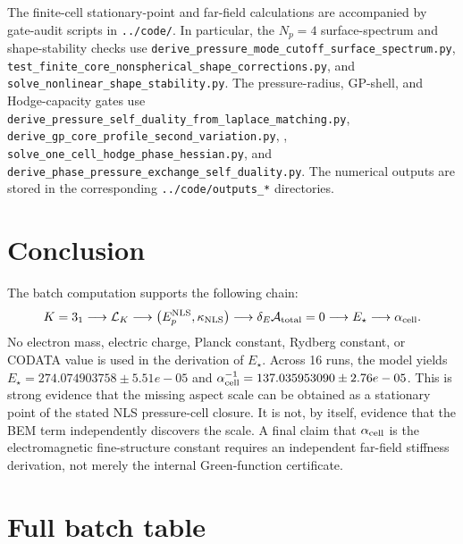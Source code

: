 \documentclass[11pt]{article}
\newcommand{\LK}{\mathcal L_K}
\newcommand{\Estar}{E_\star}
\newcommand{\alphacell}{\alpha_{\rm cell}}
\begin{document}
The finite-cell stationary-point and far-field calculations are accompanied by
gate-audit scripts in \texttt{../code/}.  In particular, the \(N_p=4\)
surface-spectrum and shape-stability checks use
\texttt{derive\_pressure\_mode\_cutoff\_surface\_spectrum.py},
\texttt{test\_finite\_core\_nonspherical\_shape\_corrections.py}, and
\texttt{solve\_nonlinear\_shape\_stability.py}.  The pressure-radius,
GP-shell, and Hodge-capacity gates use
\texttt{derive\_pressure\_self\_duality\_from\_laplace\_matching.py},
\texttt{derive\_gp\_core\_profile\_second\_variation.py}, ,
\texttt{solve\_one\_cell\_hodge\_phase\_hessian.py}, and
\texttt{derive\_phase\_pressure\_exchange\_self\_duality.py}.  The numerical
outputs are stored in the corresponding \texttt{../code/outputs\_*}
directories.

\section{Conclusion}

The batch computation supports the following chain:
\[
K=3_1
\longrightarrow
\LK
\longrightarrow
\left(E_p^{\rm NLS},\kappa_{\rm NLS}\right)
\longrightarrow
\delta_E\mathcal A_{\rm total}=0
\longrightarrow
\Estar
\longrightarrow
\alphacell.
\]
No electron mass, electric charge, Planck constant, Rydberg constant, or CODATA value is used in the derivation of \(\Estar\). Across 16 runs, the model yields \(\Estar=274.074903758\pm 5.51e-05\) and \(\alphacell^{-1}=137.035953090\pm 2.76e-05\). This is strong evidence that the missing aspect scale can be obtained as a stationary point of the stated NLS pressure-cell closure.  It is not, by itself, evidence that the BEM term independently discovers the scale.  A final claim that \(\alphacell\) is the electromagnetic fine-structure constant requires an independent far-field stiffness derivation, not merely the internal Green-function certificate.

\appendix
\section{Full batch table}
\end{document}
